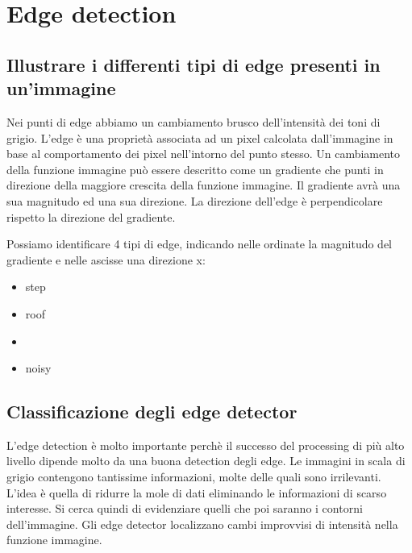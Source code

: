 \chapter{Edge detection}

\section{Illustrare i differenti tipi di edge presenti in un'immagine}
Nei punti di edge abbiamo un cambiamento brusco dell'intensità dei toni di grigio. L'edge è una proprietà associata ad un pixel calcolata dall'immagine in base al comportamento dei pixel nell'intorno del punto stesso. Un cambiamento della funzione immagine può essere descritto come un gradiente che punti in direzione della maggiore crescita della funzione immagine. Il gradiente avrà una sua magnitudo ed una sua direzione. La direzione dell'edge è perpendicolare rispetto la direzione del gradiente.

Possiamo identificare 4 tipi di edge, indicando nelle ordinate la magnitudo del gradiente e nelle ascisse una direzione x:
\begin{itemize}
	\item step
	\item roof
	\item 
	\item noisy
\end{itemize}

\section{Classificazione degli edge detector}
L'edge detection è molto importante perchè il successo del processing di più alto livello dipende molto da una buona detection degli edge. Le immagini in scala di grigio contengono tantissime informazioni, molte delle quali sono irrilevanti. L'idea è quella di ridurre la mole di dati eliminando le informazioni di scarso interesse. Si cerca quindi di evidenziare quelli che poi saranno i contorni dell'immagine. Gli edge detector localizzano cambi improvvisi di intensità nella funzione
immagine.

